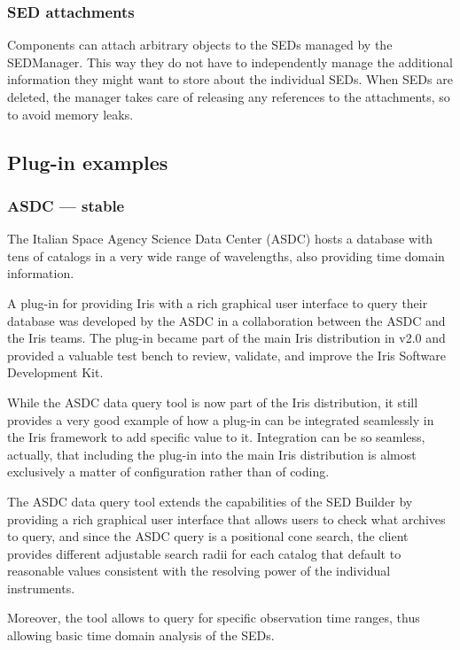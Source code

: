 \documentclass[final,5p,authoryear]{elsarticle}
\begin{document}
\subsubsection{SED attachments} Components can attach arbitrary objects to the
SEDs managed by the SEDManager. This way they do not have to independently
manage the additional information they might want to store about the individual
SEDs. When SEDs are deleted, the manager takes care of releasing any references
to the attachments, so to avoid memory leaks.



\subsection{Plug-in examples} \subsubsection{ASDC --- stable} The Italian Space
Agency Science Data Center (ASDC) hosts a database with tens of catalogs in a
very wide range of wavelengths, also providing time domain information.

A plug-in for providing Iris with a rich graphical user interface to query their
database was developed by the ASDC in a collaboration between the ASDC and the
Iris teams. The plug-in became part of the main Iris distribution in v2.0 and
provided a valuable test bench to review, validate, and improve the Iris
Software Development Kit.

While the ASDC data query tool is now part of the Iris distribution, it still
provides a very good example of how a plug-in can be integrated seamlessly in
the Iris framework to add specific value to it. Integration can be so seamless,
actually, that including the plug-in into the main Iris distribution is almost
exclusively a matter of configuration rather than of coding.

The ASDC data query tool extends the capabilities of the SED Builder by
providing a rich graphical user interface that allows users to check what
archives to query, and since the ASDC query is a positional cone search, the
client provides different adjustable search radii for each catalog that default
to reasonable values consistent with the resolving power of the individual
instruments.

Moreover, the tool allows to query for specific observation time ranges, thus
allowing basic time domain analysis of the SEDs.
\end{document}
